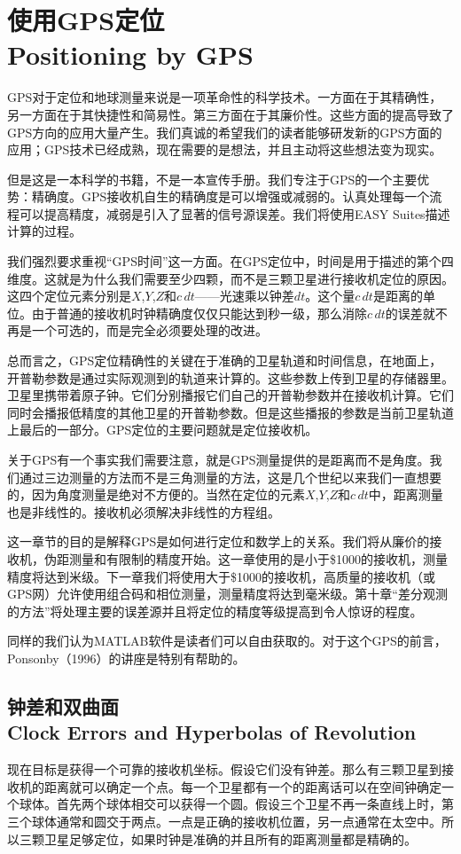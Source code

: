 \section[使用GPS定位]{使用GPS定位\\Positioning by GPS}
GPS对于定位和地球测量来说是一项革命性的科学技术。一方面在于其精确性，另一方面在于其快捷性和简易性。第三方面在于其廉价性。这些方面的提高导致了GPS方向的应用大量产生。我们真诚的希望我们的读者能够研发新的GPS方面的应用；GPS技术已经成熟，现在需要的是想法，并且主动将这些想法变为现实。

但是这是一本科学的书籍，不是一本宣传手册。我们专注于GPS的一个主要优势：精确度。GPS接收机自生的精确度是可以增强或减弱的。认真处理每一个流程可以提高精度，减弱是引入了显著的信号源误差。我们将使用EASY Suites描述计算的过程。

我们强烈要求重视“GPS时间”这一方面。在GPS定位中，时间是用于描述的第个四维度。这就是为什么我们需要至少四颗，而不是三颗卫星进行接收机定位的原因。这四个定位元素分别是$X$,$Y$,$Z$和$c\,dt$——光速乘以钟差$dt$。这个量$c\,dt$是距离的单位。由于普通的接收机时钟精确度仅仅只能达到秒一级，那么消除$c\,dt$的误差就不再是一个可选的，而是完全必须要处理的改进。

总而言之，GPS定位精确性的关键在于准确的卫星轨道和时间信息，在地面上，开普勒参数是通过实际观测到的轨道来计算的。这些参数上传到卫星的存储器里。卫星里携带着原子钟。它们分别播报它们自己的开普勒参数并在接收机计算。它们同时会播报低精度的其他卫星的开普勒参数。但是这些播报的参数是当前卫星轨道上最后的一部分。GPS定位的主要问题就是定位接收机。

关于GPS有一个事实我们需要注意，就是GPS测量提供的是距离而不是角度。我们通过三边测量的方法而不是三角测量的方法，这是几个世纪以来我们一直想要的，因为角度测量是绝对不方便的。当然在定位的元素$X$,$Y$,$Z$和$c\,dt$中，距离测量也是非线性的。接收机必须解决非线性的方程组。

这一章节的目的是解释GPS是如何进行定位和数学上的关系。我们将从廉价的接收机，伪距测量和有限制的精度开始。这一章使用的是小于\$1000的接收机，测量精度将达到米级。下一章我们将使用大于\$1000的接收机，高质量的接收机（或GPS网）允许使用组合码和相位测量，测量精度将达到毫米级。第十章“差分观测的方法”将处理主要的误差源并且将定位的精度等级提高到令人惊讶的程度。

同样的我们认为MATLAB软件是读者们可以自由获取的。对于这个GPS的前言，Ponsonby（1996）的讲座是特别有帮助的。
	\subsection[钟差和双曲面]{钟差和双曲面\\Clock Errors and Hyperbolas of Revolution}
	现在目标是获得一个可靠的接收机坐标。假设它们没有钟差。那么有三颗卫星到接收机的距离就可以确定一个点。每一个卫星都有一个的距离话可以在空间钟确定一个球体。首先两个球体相交可以获得一个圆。假设三个卫星不再一条直线上时，第三个球体通常和圆交于两点。一点是正确的接收机位置，另一点通常在太空中。所以三颗卫星足够定位，如果时钟是准确的并且所有的距离测量都是精确的。
	
